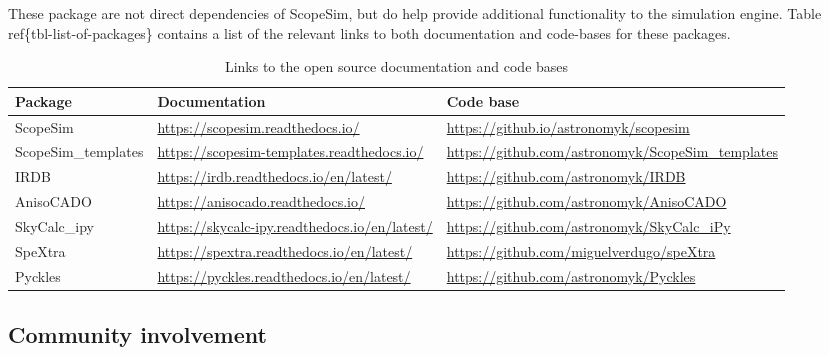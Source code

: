 These package are not direct dependencies of ScopeSim, but do help provide additional functionality to the simulation engine.
Table ref\{tbl-list-of-packages\} contains a list of the relevant links to both documentation and code-bases for these packages.

\setlength{\DUtablewidth}{\linewidth}
\begin{longtable}[c]{|p{0.315\DUtablewidth}|p{0.315\DUtablewidth}|p{0.315\DUtablewidth}|}
\caption{Links to the open source documentation and code bases}\\
\hline

Package
 & 
Documentation
 & 
Code base
 \\
\hline

ScopeSim
 & 
\url{https://scopesim.readthedocs.io/}
 & 
\url{https://github.io/astronomyk/scopesim}
 \\
\hline

ScopeSim\_templates
 & 
\url{https://scopesim-templates.readthedocs.io/}
 & 
\url{https://github.com/astronomyk/ScopeSim_templates}
 \\
\hline

IRDB
 & 
\url{https://irdb.readthedocs.io/en/latest/}
 & 
\url{https://github.com/astronomyk/IRDB}
 \\
\hline

AnisoCADO
 & 
\url{https://anisocado.readthedocs.io/}
 & 
\url{https://github.com/astronomyk/AnisoCADO}
 \\
\hline

SkyCalc\_ipy
 & 
\url{https://skycalc-ipy.readthedocs.io/en/latest/}
 & 
\url{https://github.com/astronomyk/SkyCalc_iPy}
 \\
\hline

SpeXtra
 & 
\url{https://spextra.readthedocs.io/en/latest/}
 & 
\url{https://github.com/miguelverdugo/speXtra}
 \\
\hline

Pyckles
 & 
\url{https://pyckles.readthedocs.io/en/latest/}
 & 
\url{https://github.com/astronomyk/Pyckles}
 \\
\hline
\end{longtable}
\label{tbl-list-of-packages}


\subsection{Community involvement%
  \label{community-involvement}%
}

